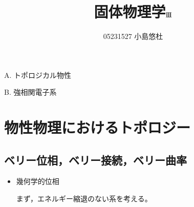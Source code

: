 \documentclass[a4paper,11pt,dvipdfmx]{jsarticle}
\title{固体物理学\(\mathrm{I}\hspace{-1.2pt}\mathrm{I}\hspace{-1.2pt}\mathrm{I}\)}
\author{05231527 小島悠杜}
\date{}
\theoremstyle{definition}%
\numberwithin{equation}{section}%
\numberwithin{theorem}{section} %
\begin{document}
\maketitle


A. トポロジカル物性

B. 強相関電子系

\section{物性物理におけるトポロジー}
\subsection{ベリー位相，ベリー接続，ベリー曲率}
\begin{itemize}
  \item 幾何学的位相
  
  まず，エネルギー縮退のない系を考える。


\end{itemize}
\end{document}
